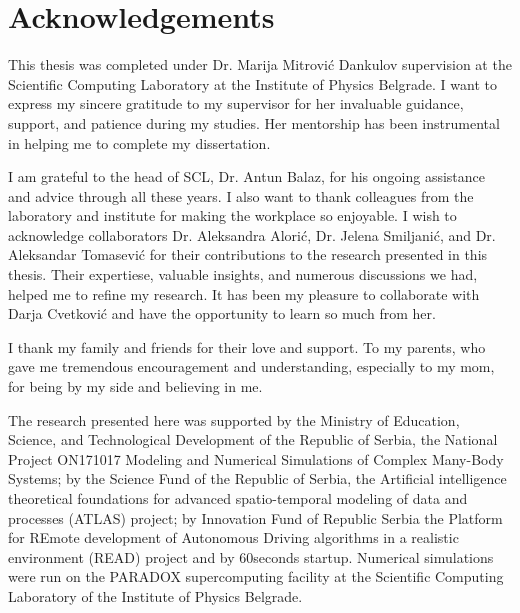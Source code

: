 
\normalsize
\chapter{Acknowledgements}

This thesis was completed under Dr. Marija Mitrović Dankulov supervision at the Scientific Computing Laboratory at the Institute of Physics Belgrade. I want to express my sincere gratitude to my supervisor for her invaluable guidance, support, and patience during my studies. Her mentorship has been instrumental in helping me to complete my dissertation.  

I am grateful to the head of SCL, Dr. Antun Balaz, for his ongoing assistance and advice through all these years. I also want to thank colleagues from the laboratory and institute for making the workplace so enjoyable. I wish to acknowledge collaborators Dr. Aleksandra Alorić, Dr. Jelena Smiljanić, and Dr. Aleksandar Tomasević for their contributions to the research presented in this thesis. Their expertiese, valuable insights, and numerous discussions we had, helped me to refine my research. It has been my pleasure to collaborate with Darja Cvetković and have the opportunity to learn so much from her.

I thank my family and friends for their love and support. To my parents, who gave me tremendous encouragement and understanding, especially to my mom, for being by my side and believing in me.

The research presented here was supported by the Ministry of Education, Science, and Technological Development of the Republic of Serbia, the National Project ON171017 Modeling and Numerical Simulations of Complex Many-Body Systems; by the Science Fund of the Republic of Serbia, the Artificial intelligence theoretical foundations for advanced spatio-temporal modeling of data and processes (ATLAS) project; by Innovation Fund of Republic Serbia the Platform for REmote development of Autonomous Driving algorithms in a realistic environment (READ) project and by 60seconds startup. Numerical simulations were run on the PARADOX supercomputing facility at the Scientific Computing Laboratory of the Institute of Physics Belgrade.

\hfill

\justify
